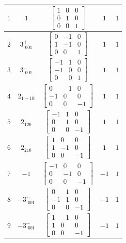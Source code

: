 \documentclass[fleqn,8pt]{jsarticle}
\begin{document}
\begin{longtable}{ccccc}
$ 1 $ & $ 1 $ & $ \begin{bmatrix} 1 & 0 & 0 \\ 0 & 1 & 0 \\ 0 & 0 & 1 \end{bmatrix} $ & $ 1 $ & $ 1 $ \\ \hline
$ 2 $ & $ 3^{+}_{\,\,001} $ & $ \begin{bmatrix} 0 & -1 & 0 \\ 1 & -1 & 0 \\ 0 & 0 & 1 \end{bmatrix} $ & $ 1 $ & $ 1 $ \\ \hline
$ 3 $ & $ 3^{-}_{\,\,001} $ & $ \begin{bmatrix} -1 & 1 & 0 \\ -1 & 0 & 0 \\ 0 & 0 & 1 \end{bmatrix} $ & $ 1 $ & $ 1 $ \\ \hline
$ 4 $ & $ 2{}_{1-10} $ & $ \begin{bmatrix} 0 & -1 & 0 \\ -1 & 0 & 0 \\ 0 & 0 & -1 \end{bmatrix} $ & $ 1 $ & $ 1 $ \\ \hline
$ 5 $ & $ 2{}_{120} $ & $ \begin{bmatrix} -1 & 1 & 0 \\ 0 & 1 & 0 \\ 0 & 0 & -1 \end{bmatrix} $ & $ 1 $ & $ 1 $ \\ \hline
$ 6 $ & $ 2{}_{210} $ & $ \begin{bmatrix} 1 & 0 & 0 \\ 1 & -1 & 0 \\ 0 & 0 & -1 \end{bmatrix} $ & $ 1 $ & $ 1 $ \\ \hline
$ 7 $ & $ -1 $ & $ \begin{bmatrix} -1 & 0 & 0 \\ 0 & -1 & 0 \\ 0 & 0 & -1 \end{bmatrix} $ & $ -1 $ & $ 1 $ \\ \hline
$ 8 $ & $ -3^{+}_{\,\,001} $ & $ \begin{bmatrix} 0 & 1 & 0 \\ -1 & 1 & 0 \\ 0 & 0 & -1 \end{bmatrix} $ & $ -1 $ & $ 1 $ \\ \hline
$ 9 $ & $ -3^{-}_{\,\,001} $ & $ \begin{bmatrix} 1 & -1 & 0 \\ 1 & 0 & 0 \\ 0 & 0 & -1 \end{bmatrix} $ & $ -1 $ & $ 1 $ \\ \hline

\end{longtable}
\end{document}
